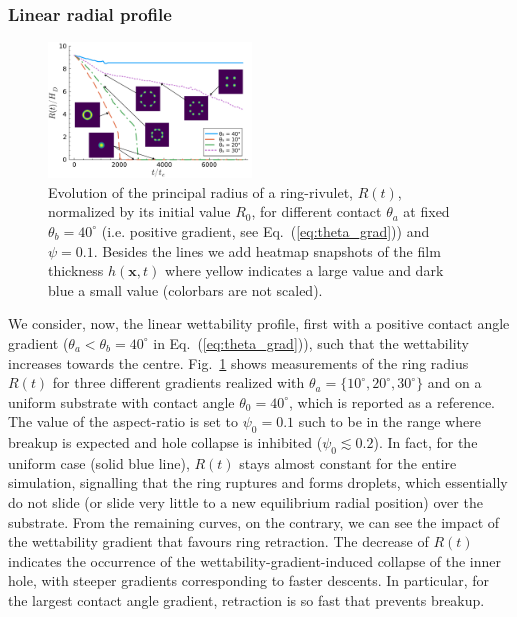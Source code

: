 \documentclass[twoside,twocolumn,9pt]{article}
\begin{document}
\subsubsection{Linear radial profile}\label{subsubsec:linwettgrad}
\begin{figure}
    \centering
    \includegraphics[width=0.48\textwidth]{assets/n_grad_thetaA.pdf}
    \caption{Evolution of the principal radius of a ring-rivulet, $R(t)$, normalized by its initial value $R_0$, for different contact $\theta_a$ at fixed $\theta_b = 40^{\circ}$ 
    (i.e. positive gradient, see Eq.~(\ref{eq:theta_grad})) and $\psi = 0.1$.
    Besides the lines we add heatmap snapshots of the film thickness $h(\mathbf{x},t)$ where yellow indicates a large value and dark blue a small value (colorbars are not scaled).}
    \label{fig:negativewetgrad}
\end{figure}
We consider, now, the linear wettability profile, first with a positive contact angle gradient ($\theta_a < \theta_b=40^{\circ}$ in Eq.~(\ref{eq:theta_grad})), such that the wettability increases towards the centre. 
Fig.~\ref{fig:negativewetgrad} shows measurements of the ring radius $R(t)$ for three different gradients realized with $\theta_a = \{ 10^{\circ}, 20^{\circ}, 30^{\circ} \}$ and on a uniform substrate with 
contact angle $\theta_0 = 40^{\circ}$, which is reported as a reference. 
The value of the aspect-ratio is set to $\psi_0 = 0.1$ such to be in the range where breakup is expected and hole collapse is inhibited ($\psi_0 \lesssim 0.2$).
In fact, for the uniform case (solid blue line),
$R(t)$ stays almost constant for the entire simulation, signalling that 
the ring ruptures and forms droplets, which essentially do not slide (or slide very little to a new equilibrium radial position) over the substrate.
From the remaining curves, on the contrary, we can see the impact of the wettability gradient that favours ring retraction. 
The decrease of $R(t)$ indicates the occurrence of the wettability-gradient-induced collapse of the inner 
hole, with steeper gradients corresponding to faster descents.
In particular, for the largest contact angle gradient, retraction is so fast that prevents breakup. 
\end{document}
